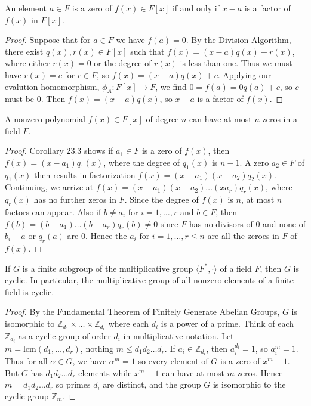 \documentclass[a4paper,8pt]{article}
\begin{document}
\begin{outline}
    An element \(a \in F\) is a zero of \(f(x) \in F[x]\) if and only if \(x-a\) is a factor of \(f(x)\) in \(F[x]\).

    \begin{proof}
      Suppose that for \(a \in F\) we have \(f(a) = 0\). By the Division Algorithm, there exist \(q(x), r(x) \in F[x]\)
      such that \(f(x) = (x-a)q(x) + r(x)\), where either \(r(x) = 0\) or the degree of \(r(x)\) is less than one. Thus
      we must have \(r(x) = c\) for \(c \in F\), so \(f(x) = (x-a)q(x) + c\). Applying our evalution homomorphism,
      \(\phi_A: F[x] \rightarrow F\), we find \(0 = f(a) = 0q(a) + c\), so \(c\) must be \(0\). Then \(f(x) = (x-a)q(x)\),
      so \(x - a\) is a factor of \(f(x)\).
    \end{proof}

    A nonzero polynomial \(f(x) \in F[x]\) of degree \(n\) can have at most \(n\) zeros in a field \(F\).

    \begin{proof}
      Corollary 23.3 shows if \(a_1 \in F\) is a zero of \(f(x)\), then \(f(x) = (x - a_1)q_1(x)\), where the degree
      of \(q_1(x)\) is \(n-1\). A zero \(a_2 \in F\) of \(q_1(x)\) then results in factorization
      \(f(x) = (x-a_1)(x-a_2)q_2(x)\). Continuing, we arrize at \(f(x) = (x-a_1)(x-a_2)\ldots(xa_r)q_r(x)\), where
      \(q_r(x)\) has no further zeros in \(F\). Since the degree of \(f(x)\) is \(n\), at most \(n\) factors can appear.
      Also if \(b \neq a_i\) for \(i = 1, \ldots, r\) and \(b \in F\), then \(f(b) = (b-a_1)\ldots(b-a_r)q_r(b) \neq 0\)
      since \(F\) has no divisors of \(0\) and none of \(b_i - a\) or \(q_r(a)\) are \(0\). Hence the \(a_i\) for \(i =
      1,\ldots,r \leq n\) are all the zeroes in \(F\) of \(f(x)\).
    \end{proof}

    If \(G\) is a finite subgroup of the multiplicative group \(\langle F^{*}, \cdot \rangle\) of a field \(F\),
    then \(G\) is cyclic. In particular, the multiplicative group of all nonzero elements of a finite field is cyclic.

    \begin{proof}
      By the Fundamental Theorem of Finitely Generate Abelian Groups, \(G\) is isomorphic to \(\mathbb{Z}_{d_1} \times
      \ldots \times \mathbb{Z}_{d_r}\) where each \(d_i\) is a power of a prime. Think of each \(\mathbb{Z}_{d_i}\) as
      a cyclic group of order \(d_i\) in multiplicative notation. Let \(m = \text{lcm}(d_1, \ldots, d_r)\), nothing
      \(m \leq d_1d_2\ldots d_r\). If \(a_i \in \mathbb{Z}_{d_i}\), then \(a_i^{d_i} = 1\), so \(a_i^m = 1\). Thus for
      all \(\alpha \in G\), we have \(\alpha^m = 1\) so every element of \(G\) is a zero of \(x^m - 1\). But \(G\) has
      \(d_1d_2\ldots d_r\) elements while \(x^m - 1\) can have at most \(m\) zeros. Hence \(m = d_1d_2 \ldots d_r\) so
      primes \(d_i\) are distinct, and the group \(G\) is isomorphic to the cyclic group \(\mathbb{Z}_m\).
    \end{proof}

\end{outline}
\end{document}
